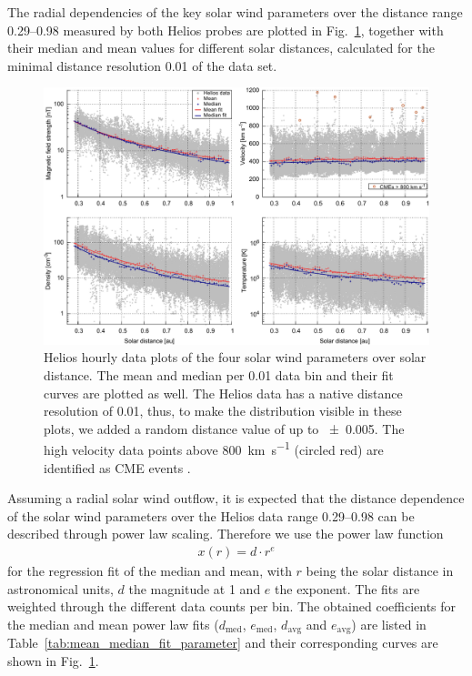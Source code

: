 \documentclass[]{aa}
\begin{document}
	The radial dependencies of the key solar wind parameters over the distance range \SIrange{0.29}{0.98}{\au} measured by both Helios probes are plotted in Fig.~\ref{fig:radial_fit_4_thesis_light_b_skip}, together with their median and mean values for different solar distances, calculated for the minimal distance resolution \SI{0.01}{\au} of the data set.
	\begin{figure}
		\includegraphics[width=18cm]{figures/radial_fit_4_thesis_light_b_skip.pdf}
		\caption{Helios hourly data plots of the four solar wind parameters over solar distance. The mean and median per \SI{0.01}{\au} data bin and their fit curves are plotted as well. The Helios data has a native distance resolution of \SI{0.01}{\au}, thus, to make the distribution visible in these plots, we added a random distance value of up to \SI{+-0.005}{\au}. The high velocity data points above \SI{800}{\km\per\s} (circled red) are identified as CME events \citep[e.g.,][]{Sheeley1985,Bothmer1996,Bothmer1998}.}
		\label{fig:radial_fit_4_thesis_light_b_skip}
	\end{figure}
	Assuming a radial solar wind outflow, it is expected that the distance dependence of the solar wind parameters over the Helios data range \SIrange{0.29}{0.98}{\au} can be described through power law scaling. Therefore we use the power law function
	\begin{align}
		x(r) = d\cdot r^e	\label{eq:power_function}
	\end{align}
	for the regression fit of the median and mean, with $r$ being the solar distance in astronomical units, $d$ the magnitude at \SI{1}{\au} and $e$ the exponent. The fits are weighted through the different data counts per bin.
	The obtained coefficients for the median and mean power law fits ($d_\text{med}$, $e_\text{med}$, $d_\text{avg}$ and $e_\text{avg}$) are listed in Table~\ref{tab:mean_median_fit_parameter} and their corresponding curves are shown in Fig.~\ref{fig:radial_fit_4_thesis_light_b_skip}.
\end{document}
